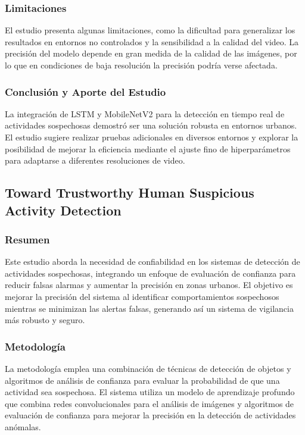 \documentclass[listof=nochaptergap,12pt,times,authoryear]{report}
\begin{document}
\subsubsection{Limitaciones}
El estudio presenta algunas limitaciones, como la dificultad para generalizar los resultados en entornos no controlados y la sensibilidad a la calidad del video. La precisión del modelo depende en gran medida de la calidad de las imágenes, por lo que en condiciones de baja resolución la precisión podría verse afectada.

\subsubsection{Conclusión y Aporte del Estudio}
La integración de LSTM y MobileNetV2 para la detección en tiempo real de actividades sospechosas demostró ser una solución robusta en entornos urbanos. El estudio sugiere realizar pruebas adicionales en diversos entornos y explorar la posibilidad de mejorar la eficiencia mediante el ajuste fino de hiperparámetros para adaptarse a diferentes resoluciones de video.








\subsection{Toward Trustworthy Human Suspicious Activity Detection}

\subsubsection{Resumen}
Este estudio aborda la necesidad de confiabilidad en los sistemas de detección de actividades sospechosas, integrando un enfoque de evaluación de confianza para reducir falsas alarmas y aumentar la precisión en zonas urbanos. El objetivo es mejorar la precisión del sistema al identificar comportamientos sospechosos mientras se minimizan las alertas falsas, generando así un sistema de vigilancia más robusto y seguro.

\subsubsection{Metodología}
La metodología emplea una combinación de técnicas de detección de objetos y algoritmos de análisis de confianza para evaluar la probabilidad de que una actividad sea sospechosa. El sistema utiliza un modelo de aprendizaje profundo que combina redes convolucionales para el análisis de imágenes y algoritmos de evaluación de confianza para mejorar la precisión en la detección de actividades anómalas.
\end{document}
